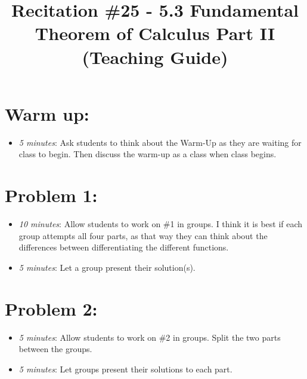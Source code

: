 \documentclass[handout,nooutcomes]{ximera}
\title{Recitation \#25 - 5.3 Fundamental Theorem of Calculus Part II (Teaching Guide)}
\begin{document}
\begin{abstract}		\end{abstract}
\maketitle


\section*{Warm up:} 
	
	\begin{itemize}
	
	\item  \emph{5 minutes}:  Ask students to think about the Warm-Up as they are waiting for class to begin.  Then discuss the warm-up as a class when class begins.
	
	
	
	\end{itemize}


\section*{Problem 1:}

	\begin{itemize}
	
	\item  \emph{10 minutes}:  Allow students to work on \#1 in groups.  I think it is best if each group attempts all four parts, as that way they can think about the differences between differentiating the different functions.
	
	\item  \emph{5 minutes}:  Let a group present their solution(s).
	
	\end{itemize}



\section*{Problem 2:}

	\begin{itemize}
	
	\item  \emph{5 minutes}:  Allow students to work on \#2 in groups.  Split the two parts between the groups.
		
	\item  \emph{5 minutes}:  Let groups present their solutions to each part.
			
	\end{itemize}
	
\end{document}
